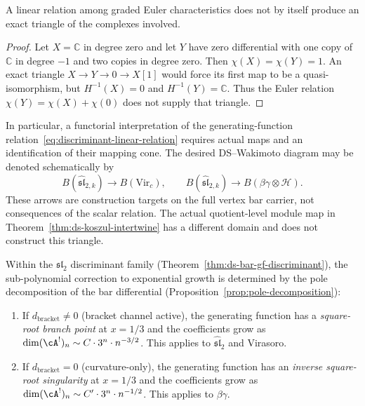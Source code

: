 \begin{proposition}
\label{prop:linear-relation-functorial}
A linear relation among graded Euler characteristics does not by itself produce an exact triangle of the complexes involved.
\end{proposition}
\begin{proof}
Let $X=\mathbb C$ in degree zero and let $Y$ have zero differential with one copy of $\mathbb C$ in degree $-1$ and two copies in degree zero.
Then $\chi(X)=\chi(Y)=1$.
An exact triangle $X\to Y\to0\to X[1]$ would force its first map to be a quasi-isomorphism, but $H^{-1}(X)=0$ and $H^{-1}(Y)=\mathbb C$.
Thus the Euler relation $\chi(Y)=\chi(X)+\chi(0)$ does not supply that triangle.
\end{proof}
In particular, a functorial interpretation of the generating-function relation~\eqref{eq:discriminant-linear-relation} requires actual maps and an identification of their mapping cone.
The desired DS--Wakimoto diagram may be denoted schematically by
\begin{equation}\label{eq:wakimoto-ds-triangle}
 B(\widehat{\mathfrak{sl}}_{2,k})\longrightarrow B(\mathrm{Vir}_c),
 \qquad B(\widehat{\mathfrak{sl}}_{2,k})\longrightarrow B(\beta\gamma\otimes\mathcal H).
\end{equation}
These arrows are construction targets on the full vertex bar carrier, not consequences of the scalar relation.
The actual quotient-level module map in Theorem~\ref{thm:ds-koszul-intertwine} has a different domain and does not construct this triangle.

\begin{proposition}
\label{prop:pole-singularity-type}
Within the $\mathfrak{sl}_2$ discriminant family
(Theorem~\textup{\ref{thm:ds-bar-gf-discriminant}}), the sub-polynomial
correction to exponential growth is determined by the pole decomposition
of the bar differential
(Proposition~\textup{\ref{prop:pole-decomposition}}):
\begin{enumerate}
\item If $d_{\mathrm{bracket}} \neq 0$ (bracket channel active),
  the generating function has a \emph{square-root branch point}
  at $x = 1/3$ and the coefficients grow as
  $\dim (\cA^!)_n \sim C \cdot 3^n \cdot n^{-3/2}$.
  This applies to $\widehat{\mathfrak{sl}}_2$ and Virasoro.
\item If $d_{\mathrm{bracket}} = 0$ (curvature-only), the generating function
  has an \emph{inverse square-root singularity} at $x = 1/3$ and
  the coefficients grow as
  $\dim (\cA^!)_n \sim C' \cdot 3^n \cdot n^{-1/2}$.
  This applies to $\beta\gamma$.
\end{enumerate}
\end{proposition}

